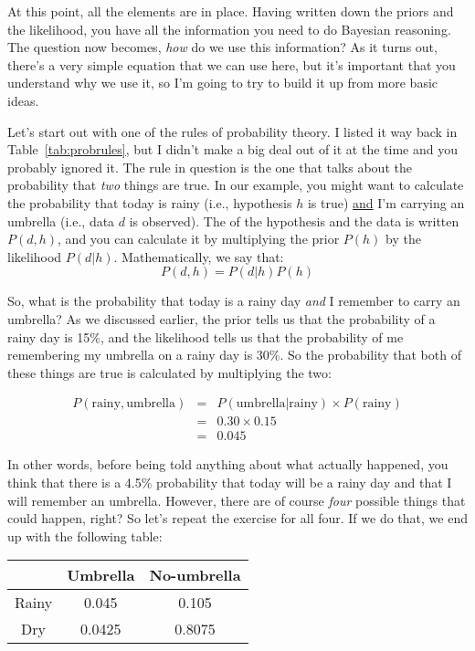 
At this point, all the elements are in place. Having written down the priors and the likelihood, you have all the information you need to do Bayesian reasoning. The question now becomes, {\it how} do we use this information? As it turns out, there's a very simple equation that we can use here, but it's important that you understand why we use it, so I'm going to try to build it up from more basic ideas.

Let's start out with one of the rules of probability theory. I listed it way back in Table~\ref{tab:probrules}, but I didn't make a big deal out of it at the time and you probably ignored it. The rule in question is the one that talks about the probability that {\it two} things are true. In our example, you might want to calculate the probability that today is rainy (i.e., hypothesis $h$ is true) \underline{and} I'm carrying an umbrella (i.e., data $d$ is observed). The  of the hypothesis and the data is written $P(d,h)$, and you can calculate it by multiplying the prior $P(h)$ by the likelihood $P(d|h)$. Mathematically, we say that:
$$
P(d,h) = P(d|h) P(h)
$$

\noindent
So, what is the probability that today is a rainy day {\it and} I remember to carry an umbrella? As we discussed earlier, the prior tells us that the probability of a rainy day is 15\%, and the likelihood tells us that the probability of me remembering my umbrella on a rainy day is 30\%. So the probability that both of these things are true is calculated by multiplying the two:

\begin{eqnarray*}
P(\mbox{rainy}, \mbox{umbrella}) & = & P(\mbox{umbrella} | \mbox{rainy}) \times P(\mbox{rainy}) \\
& = & 0.30 \times 0.15 \\
& = & 0.045
\end{eqnarray*}

\noindent
In other words, before being told anything about what actually happened, you think that there is a 4.5\% probability that today will be a rainy day and that I will remember an umbrella. However, there are of course {\it four} possible things that could happen, right? So let's repeat the exercise for all four. If we do that, we end up with the following table:

\begin{center}
\begin{tabular}{c|cc}
& Umbrella & No-umbrella \\ \hline
Rainy & 0.045 & 0.105 \\
Dry & 0.0425 & 0.8075
\end{tabular}
\end{center}

